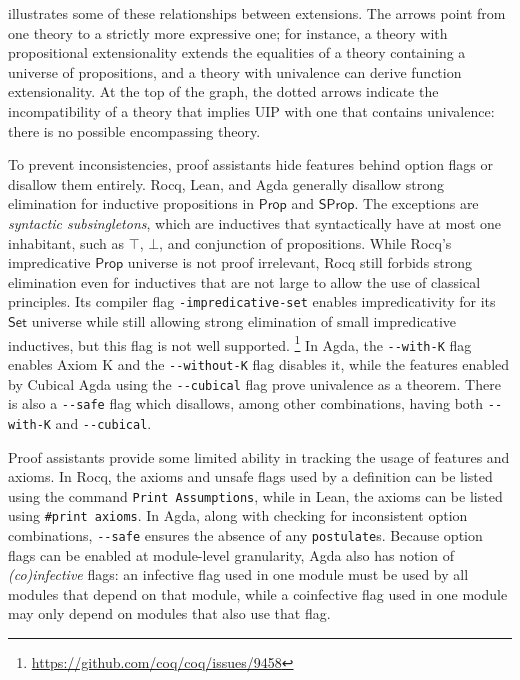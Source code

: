 \documentclass{article}
\newcommand{\kw}[1]{\mathsf{#1}}
\newcommand{\code}[1]{\texttt{#1}}
\begin{document}
 illustrates some of these relationships between extensions.
The arrows point from one theory to a strictly more expressive one;
for instance, a theory with propositional extensionality extends the equalities
of a theory containing a universe of propositions,
and a theory with univalence can derive function extensionality.
At the top of the graph, the dotted arrows indicate
the incompatibility of a theory that implies UIP with one that contains univalence:
there is no possible encompassing theory.

To prevent inconsistencies, proof assistants hide features behind option flags
or disallow them entirely.
Rocq, Lean, and Agda generally disallow strong elimination for inductive propositions
in $\kw{Prop}$ and $\kw{SProp}$.
The exceptions are \emph{syntactic subsingletons},
which are inductives that syntactically have at most one inhabitant,
such as $\top$, $\bot$, and conjunction of propositions.
While Rocq's impredicative $\kw{Prop}$ universe is not proof irrelevant,
Rocq still forbids strong elimination even for inductives that are not large
to allow the use of classical principles.
Its compiler flag \code{-impredicative-set} enables impredicativity for its $\kw{Set}$ universe
while still allowing strong elimination of small impredicative inductives,
but this flag is not well supported.%
\footnote{\url{https://github.com/coq/coq/issues/9458}}
In Agda, the \code{-{}-with-K} flag enables Axiom K
and the \code{-{}-without-K} flag disables it,
while the features enabled by Cubical Agda using the \code{-{}-cubical} flag
prove univalence as a theorem.
There is also a \code{-{}-safe} flag which disallows,
among other combinations,
having both \code{-{}-with-K} and \code{-{}-cubical}.

Proof assistants provide some limited ability in tracking the usage of features and axioms.
In Rocq, the axioms and unsafe flags used by a definition
can be listed using the command \code{Print Assumptions},
while in Lean, the axioms can be listed using \code{\#print axioms}.
In Agda, along with checking for inconsistent option combinations,
\code{-{}-safe} ensures the absence of any \code{postulate}s.
Because option flags can be enabled at module-level granularity,
Agda also has notion of \emph{(co)infective} flags:
an infective flag used in one module
must be used by all modules that depend on that module,
while a coinfective flag used in one module
may only depend on modules that also use that flag.
\end{document}
